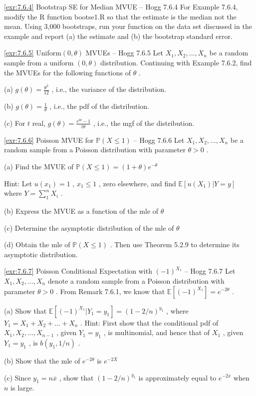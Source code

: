 \begin{exercise}{\ref{exr:7.6.4} Bootstrap SE for Median MVUE – Hogg 7.6.4}\label{exr:7.6.4}
For Example 7.6.4, modify the R function bootse1.R so that the estimate is the median not the mean. Using 3,000 bootstraps, run your function on the data set discussed in the example and report (a) the estimate and (b) the bootstrap standard error.
\end{exercise}

\begin{exercise}{\ref{exr:7.6.5} Uniform$(0, \theta)$ MVUEs – Hogg 7.6.5}\label{exr:7.6.5}
Let $X_{1}, X_{2}, \ldots, X_{n}$ be a random sample from a uniform $(0, \theta)$ distribution. Continuing with Example 7.6.2, find the MVUEs for the following functions of $\theta$ .

(a) $g(\theta) = \frac{\theta^2}{12}$ , i.e., the variance of the distribution.

(b) $g(\theta) = \frac{1}{\theta}$ , i.e., the pdf of the distribution.

(c) For $t$ real, $g(\theta) = \frac{e^{t\theta} - 1}{t\theta}$ , i.e., the mgf of the distribution.
\end{exercise}

\begin{exercise}{\ref{exr:7.6.6} Poisson MVUE for $\mathbb{P}(X \leq 1)$ – Hogg 7.6.6}\label{exr:7.6.6}
Let $X_{1}, X_{2}, \ldots, X_{n}$ be a random sample from a Poisson distribution with parameter $\theta > 0$ .

(a) Find the MVUE of $\mathbb{P}(X\leq 1) = (1 + \theta)e^{-\theta}$

Hint: Let $u(x_{1}) = 1$ , $x_{1} \leq 1$ , zero elsewhere, and find $\mathbb{E}[u(X_1)|Y = y]$ where $Y = \sum_{1}^{n}X_{i}$ .

(b) Express the MVUE as a function of the mle of $\theta$

(c) Determine the asymptotic distribution of the mle of $\theta$

(d) Obtain the mle of $\mathbb{P}(X \leq 1)$ . Then use Theorem 5.2.9 to determine its asymptotic distribution.
\end{exercise}

\begin{exercise}{\ref{exr:7.6.7} Poisson Conditional Expectation with $(-1)^{X_{1}}$ – Hogg 7.6.7}\label{exr:7.6.7}
Let $X_{1}, X_{2}, \ldots, X_{n}$ denote a random sample from a Poisson distribution with parameter $\theta > 0$ . From Remark 7.6.1, we know that $\mathbb{E}[(-1)^{X_1}] = e^{-2\theta}$ .

(a) Show that $\mathbb{E}[(-1)^{X_1}|Y_1 = y_1] = (1 - 2/n)^{y_1}$ , where $Y_1 = X_1 + X_2 + \dots + X_n$ . Hint: First show that the conditional pdf of $X_1, X_2, \ldots, X_{n-1}$ , given $Y_1 = y_1$ , is multinomial, and hence that of $X_1$ , given $Y_1 = y_1$ , is $b(y_1, 1/n)$ .

(b) Show that the mle of $e^{-2\theta}$ is $e^{-2\overline{X}}$

(c) Since $y_{1} = n\overline{x}$ , show that $(1 - 2 / n)^{y_1}$ is approximately equal to $e^{-2\overline{x}}$ when $n$ is large.
\end{exercise}


